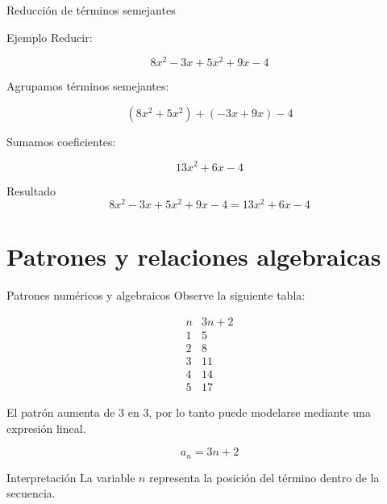 \documentclass[handout,aspectratio=169]{beamer}
\begin{document}
	\begin{frame}{Reducción de términos semejantes}
		\begin{exampleblock}{Ejemplo}
			Reducir:
			
			\[
			8x^2-3x+5x^2+9x-4
			\]
		\end{exampleblock}
		
		\pause
		
		Agrupamos términos semejantes:
		
		\[
		(8x^2+5x^2)+(-3x+9x)-4
		\]
		
		\pause
		
		Sumamos coeficientes:
		
		\[
		13x^2+6x-4
		\]
		
		\pause
		
		\begin{block}{Resultado}
			\[
			8x^2-3x+5x^2+9x-4
			=
			13x^2+6x-4
			\]
		\end{block}
	\end{frame}
	
	\section{Patrones y relaciones algebraicas}
	
	\begin{frame}{Patrones numéricos y algebraicos}
		Observe la siguiente tabla:
		
		\[
		\begin{array}{c|c}
			n & 3n+2 \\
			\hline
			1 & 5 \\
			2 & 8 \\
			3 & 11 \\
			4 & 14 \\
			5 & 17
		\end{array}
		\]
		
		\pause
		
		\begin{idea}
			El patrón aumenta de \(3\) en \(3\), por lo tanto puede modelarse mediante una expresión lineal.
		\end{idea}
		
		\pause
		
		\[
		a_n=3n+2
		\]
		
		\pause
		
		\begin{block}{Interpretación}
			La variable \(n\) representa la posición del término dentro de la secuencia.
		\end{block}
	\end{frame}
	
\end{document}
